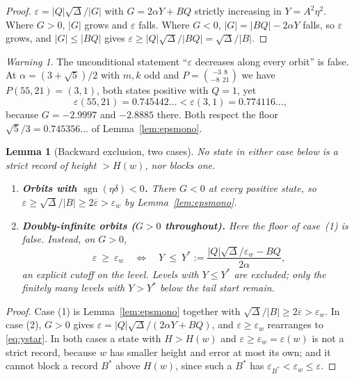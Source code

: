 \documentclass[11pt]{article}
\newtheorem{lemma}[theorem]{Lemma}
\theoremstyle{definition}
\theoremstyle{remark}
\newtheorem{warning}[theorem]{Warning}
\newcommand{\dd}{\delta}
\newcommand{\epsbar}{\overline{\varepsilon}}
\newcommand{\epsw}{\varepsilon_w}
\newcommand{\sgn}{\operatorname{sgn}}
\begin{document}
\begin{proof}
$\varepsilon=|Q|\sqrt\Delta/|G|$ with $G=2\alpha Y+BQ$ strictly increasing in $Y=A^2\eta^2$.
Where $G>0$, $|G|$ grows and $\varepsilon$ falls. Where $G<0$, $|G|=|BQ|-2\alpha Y$ falls, so
$\varepsilon$ grows, and $|G|\le|BQ|$ gives
$\varepsilon\ge|Q|\sqrt\Delta/|BQ|=\sqrt\Delta/|B|$.
\end{proof}

\begin{warning}\label{warn:epsmono}
The unconditional statement ``$\varepsilon$ decreases along every orbit'' is false. At
$\alpha=(3+\sqrt5)/2$ with $m,k$ odd and $P=\binom{-3\ \ 8}{-8\ \ 21}$ we have
$P(55,21)=(3,1)$, both states positive with $Q=1$, yet
\[
\varepsilon(55,21)=0.745442\ldots<\varepsilon(3,1)=0.774116\ldots,
\]
because $G=-2.9997$ and $-2.8885$ there. Both respect the floor $\sqrt5/3=0.745356\ldots$ of
Lemma~\ref{lem:epsmono}.
\end{warning}

\begin{lemma}[Backward exclusion, two cases]\label{lem:backward}
No state in either case below is a strict record of height $>H(w)$, nor blocks one.
\begin{enumerate}\itemsep2pt
\item \textbf{Orbits with $\sgn(\eta\dd)<0$.} There $G<0$ at every positive state, so
$\varepsilon\ge\sqrt\Delta/|B|\ge2\epsbar>\epsw$ by Lemma~\ref{lem:epsmono}.
\item \textbf{Doubly-infinite orbits ($G>0$ throughout).} Here the floor of case~(1) is
\emph{false}. Instead, on $G>0$,
\begin{equation}\label{eq:ystar}
\varepsilon\ \ge\ \epsw
\quad\Longleftrightarrow\quad
Y\ \le\ Y^{*}:=\frac{|Q|\sqrt\Delta/\epsw-BQ}{2\alpha},
\end{equation}
an explicit cutoff on the level. Levels with $Y\le Y^{*}$ are excluded; only the finitely many
levels with $Y>Y^{*}$ below the tail start remain.
\end{enumerate}
\end{lemma}

\begin{proof}
Case (1) is Lemma~\ref{lem:epsmono} together with
$\sqrt\Delta/|B|\ge2\epsbar>\epsw$. In case (2), $G>0$ gives
$\varepsilon=|Q|\sqrt\Delta/(2\alpha Y+BQ)$, and $\varepsilon\ge\epsw$ rearranges to
\eqref{eq:ystar}. In both cases a state with $H>H(w)$ and $\varepsilon\ge\epsw=\varepsilon(w)$
is not a strict record, because $w$ has smaller height and error at most its own; and it cannot
block a record $B^{*}$ above $H(w)$, since such a $B^{*}$ has
$\varepsilon_{B^{*}}<\epsw\le\varepsilon$.
\end{proof}
\end{document}

